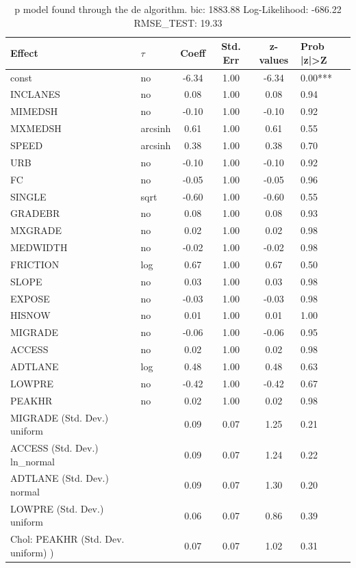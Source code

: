 \begin{table}
	\caption{p model found through the de algorithm. bic: 1883.88 Log-Likelihood: -686.22 RMSE_TEST: 19.33}
	\begin{center}
		\begin{tabular}{|l|l|c|c|c|l|}
			\hline
			Effect & $\tau$ & Coeff & Std. Err & z-values & Prob |z|>Z \\
			\hline
			const & no & -6.34 & 1.00 & -6.34 & 0.00*** \\
			\hline
			INCLANES & no & 0.08 & 1.00 & 0.08 & 0.94 \\
			\hline
			MIMEDSH & no & -0.10 & 1.00 & -0.10 & 0.92 \\
			\hline
			MXMEDSH & arcsinh & 0.61 & 1.00 & 0.61 & 0.55 \\
			\hline
			SPEED & arcsinh & 0.38 & 1.00 & 0.38 & 0.70 \\
			\hline
			URB & no & -0.10 & 1.00 & -0.10 & 0.92 \\
			\hline
			FC & no & -0.05 & 1.00 & -0.05 & 0.96 \\
			\hline
			SINGLE & sqrt & -0.60 & 1.00 & -0.60 & 0.55 \\
			\hline
			GRADEBR & no & 0.08 & 1.00 & 0.08 & 0.93 \\
			\hline
			MXGRADE & no & 0.02 & 1.00 & 0.02 & 0.98 \\
			\hline
			MEDWIDTH & no & -0.02 & 1.00 & -0.02 & 0.98 \\
			\hline
			FRICTION & log & 0.67 & 1.00 & 0.67 & 0.50 \\
			\hline
			SLOPE & no & 0.03 & 1.00 & 0.03 & 0.98 \\
			\hline
			EXPOSE & no & -0.03 & 1.00 & -0.03 & 0.98 \\
			\hline
			HISNOW & no & 0.01 & 1.00 & 0.01 & 1.00 \\
			\hline
			MIGRADE & no & -0.06 & 1.00 & -0.06 & 0.95 \\
			\hline
			ACCESS & no & 0.02 & 1.00 & 0.02 & 0.98 \\
			\hline
			ADTLANE & log & 0.48 & 1.00 & 0.48 & 0.63 \\
			\hline
			LOWPRE & no & -0.42 & 1.00 & -0.42 & 0.67 \\
			\hline
			PEAKHR & no & 0.02 & 1.00 & 0.02 & 0.98 \\
			\hline
			MIGRADE (Std. Dev.) uniform &  & 0.09 & 0.07 & 1.25 & 0.21 \\
			\hline
			ACCESS (Std. Dev.) ln_normal &  & 0.09 & 0.07 & 1.24 & 0.22 \\
			\hline
			ADTLANE (Std. Dev.) normal &  & 0.09 & 0.07 & 1.30 & 0.20 \\
			\hline
			LOWPRE (Std. Dev.) uniform &  & 0.06 & 0.07 & 0.86 & 0.39 \\
			\hline
			 Chol: PEAKHR (Std. Dev. uniform) ) &  & 0.07 & 0.07 & 1.02 & 0.31 \\
			\hline
		\end{tabular}
	\end{center}
\end{table}